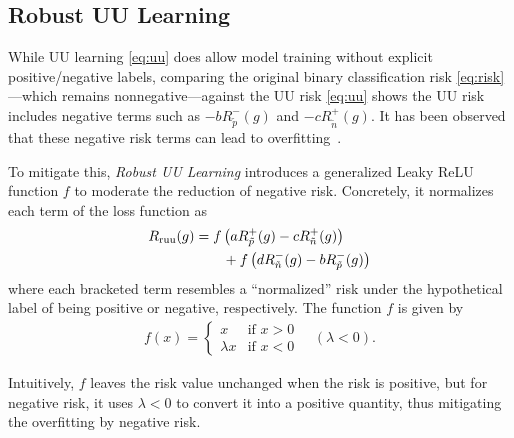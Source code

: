 \subsection{Robust UU Learning}
\label{subsec:ruu}
While UU learning \eqref{eq:uu} does allow model training without explicit positive/negative labels, comparing the original binary classification risk \eqref{eq:risk}—which remains nonnegative—against the UU risk \eqref{eq:uu} shows the UU risk includes negative terms such as $-b R_{\tilde{p}}^-(g)$ and $-c R_{\tilde{n}}^+(g)$. It has been observed that these negative risk terms can lead to overfitting~\citep{Lu2020-dx}.

To mitigate this, \emph{Robust UU Learning} introduces a generalized Leaky ReLU function $f$ to moderate the reduction of negative risk. Concretely, it normalizes each term of the loss function as~\citep{Lu2020-dx}
\begin{align}
    R_{\mathrm{ruu}}(g)
    &= f\left(a R_{\tilde{p}}^+(g) - c R_{\tilde{n}}^+(g) \right) \notag \\
    &\hspace{2em}+ f\left(d R_{\tilde{n}}^-(g) - b R_{\tilde{p}}^-(g)\right) \label{eq:ruu}
\end{align}
where each bracketed term resembles a “normalized” risk under the hypothetical label of being positive or negative, respectively. The function $f$ is given by
\begin{align}
    f(x) =
    \begin{cases}
    x & \text{if } x > 0 \\
    \lambda x & \text{if } x < 0
    \end{cases}
    \quad (\lambda < 0).
    \label{eq:relu}
\end{align}

Intuitively, $f$ leaves the risk value unchanged when the risk is positive, but for negative risk, it uses $\lambda < 0$ to convert it into a positive quantity, thus mitigating the overfitting by negative risk.
